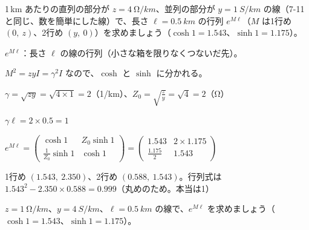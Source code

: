 \begin{reidai}[送電線]
1\,km あたりの直列の部分が $z=\qty{4}{\ohm/km}$、並列の部分が $y=\qty{1}{S/km}$ の線（7-11 と同じ、数を簡単にした線）で、長さ $\ell=\qty{0.5}{km}$ の行列 $e^{M\ell}$（$M$ は1行め $(0,\ z)$、2行め $(y,\ 0)$）を求めましょう（$\cosh1=1.543$、$\sinh1=1.175$）。\par
\kangaekata {}\par
{}\enspace $e^{M\ell}$：長さ $\ell$ の線の行列（小さな箱を限りなくつないだ先）。\par
{}\enspace $M^2=zyI=\gamma^2I$ なので、$\cosh$ と $\sinh$ に分かれる。\par
\shiki\kixls{}\zw{} $\gamma=\sqrt{zy}=\sqrt{4\times1}=2$（1/km）、$Z_0=\sqrt{\frac zy}=\sqrt4=2$（Ω）\par
\kixla $\gamma\ell=2\times0.5=1$\par
\kixla $e^{M\ell}=\begin{pmatrix}\cosh1&Z_0\sinh1\\\frac{1}{Z_0}\sinh1&\cosh1\end{pmatrix}=\begin{pmatrix}1.543&2\times1.175\\\frac{1.175}{2}&1.543\end{pmatrix}$\par
\kotae 1行め $(1.543,\ 2.350)$、2行め $(0.588,\ 1.543)$。行列式は $1.543^2-2.350\times0.588=0.999$（丸めのため。本当は1）
\end{reidai}

\begin{jibun}
$z=\qty{1}{\ohm/km}$、$y=\qty{4}{S/km}$、$\ell=\qty{0.5}{km}$ の線で、$e^{M\ell}$ を求めましょう（$\cosh1=1.543$、$\sinh1=1.175$）。
\end{jibun}

